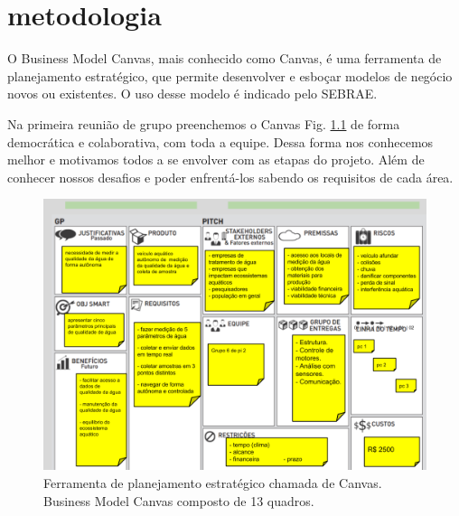 \chapter[Metodologia]{metodologia}

O Business Model Canvas, mais conhecido como Canvas, é uma ferramenta de planejamento estratégico, que permite desenvolver e esboçar modelos de negócio novos ou existentes. O uso desse modelo é indicado pelo SEBRAE.

Na primeira reunião de grupo  preenchemos o Canvas Fig. \ref{Canvas} de forma democrática e colaborativa, com toda a equipe. Dessa forma nos conhecemos melhor e motivamos todos a se envolver com as etapas do projeto. Além de conhecer nossos desafios e poder enfrentá-los sabendo os requisitos de cada área. 


 \begin{figure} [!htp]
	\centering
	\includegraphics[scale=0.3]{figuras/Canvas}
	\caption{Ferramenta de planejamento estratégico chamada de Canvas. Business Model Canvas composto de 13 quadros.}
	\label{Canvas}
\end{figure}